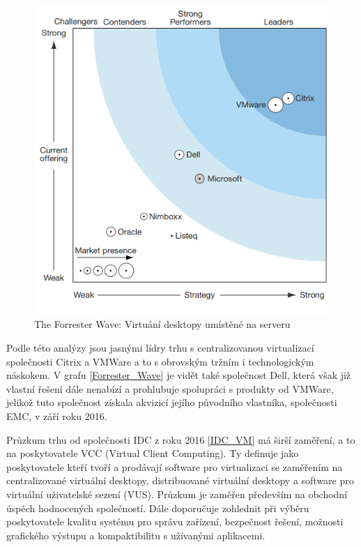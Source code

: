  \begin{figure}[h!]\label{Forrester_Wave}
\includegraphics[width=13cm]{img/Forrester_Wave}
\caption{The Forrester Wave: Virtuání desktopy umístěné na serveru} 
\label{EMM:quadrant}
\centering
\end{figure}

Podle této analýzy jsou jasnými lídry trhu s centralizovanou virtualizací společnosti Citrix a VMWare a to s obrovským tržním i technologickým náskokem. V grafu \ref{Forrester_Wave} je vidět také společnost Dell, která však již vlastní řešení dále nenabízí a prohlubuje spolupráci s produkty od VMWare, jelikož tuto společnost získala akvizicí jejího původního vlastníka, společnosti EMC, v září roku 2016.  

Průzkum trhu od společnosti IDC z roku 2016  \ref{IDC_VM} má širší zaměření, a to na poskytovatele VCC (Virtual Client Computing). Ty definuje jako poskytovatele kteří tvoří a prodávají software pro virtualizaci se zaměřením na centralizované virtuální desktopy, distribuované virtuální desktopy a software pro virtuální uživatelské sezení (VUS). Průzkum je zaměřen především na obchodní úspěch hodnocených společností. Dále doporučuje zohlednit při výběru poskytovatele kvalitu systému pro správu zařízení, bezpečnost řešení, možnosti grafického výstupu a kompaktibilitu s užívanými aplikacemi. 

